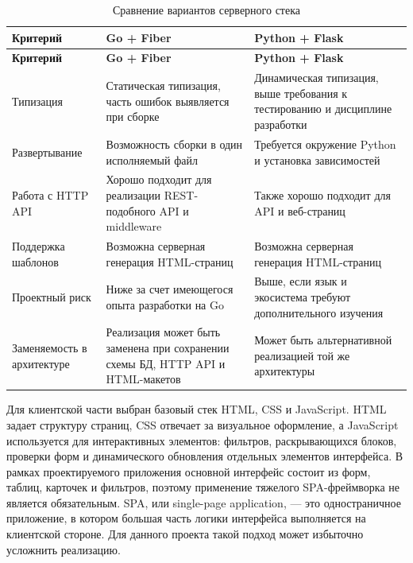 \small
\begin{longtable}{|p{}|p{}|p{}|}
    \caption{Сравнение вариантов серверного стека} \label{tab:stack_compare} \\
    \hline
    \textbf{Критерий} & \textbf{Go + Fiber} & \textbf{Python + Flask} \\ \hline
    \endfirsthead

    \tabcont{\ref{tab:stack_compare}}
    \textbf{Критерий} & \textbf{Go + Fiber} & \textbf{Python + Flask} \\ \hline
    \endhead

    \hline
    \endfoot

    \hline
    \endlastfoot

    Типизация & Статическая типизация, часть ошибок выявляется при сборке & Динамическая типизация, выше требования к тестированию и дисциплине разработки \\ \hline
    Развертывание & Возможность сборки в один исполняемый файл & Требуется окружение Python и установка зависимостей \\ \hline
    Работа с HTTP API & Хорошо подходит для реализации REST-подобного API и middleware & Также хорошо подходит для API и веб-страниц \\ \hline
    Поддержка шаблонов & Возможна серверная генерация HTML-страниц & Возможна серверная генерация HTML-страниц \\ \hline
    Проектный риск & Ниже за счет имеющегося опыта разработки на Go & Выше, если язык и экосистема требуют дополнительного изучения \\ \hline
    Заменяемость в архитектуре & Реализация может быть заменена при сохранении схемы БД, HTTP API и HTML-макетов & Может быть альтернативной реализацией той же архитектуры \\ \hline
\end{longtable}
\normalsize

Для клиентской части выбран базовый стек HTML, CSS и JavaScript. HTML задает
структуру страниц, CSS отвечает за визуальное оформление, а JavaScript
используется для интерактивных элементов: фильтров, раскрывающихся блоков,
проверки форм и динамического обновления отдельных элементов интерфейса. В
рамках проектируемого приложения основной интерфейс состоит из форм, таблиц,
карточек и фильтров, поэтому применение тяжелого SPA-фреймворка не является
обязательным. SPA, или single-page application, --- это одностраничное
приложение, в котором большая часть логики интерфейса выполняется на клиентской
стороне. Для данного проекта такой подход может избыточно усложнить реализацию.

